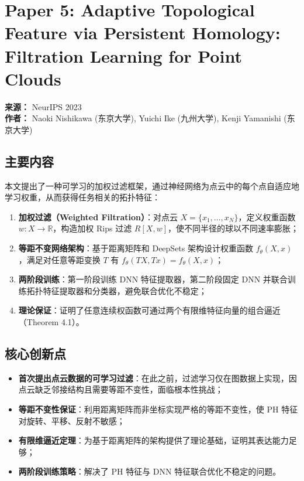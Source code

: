 \documentclass[11pt,a4paper]{article}
\begin{document}
\section{Paper 5: Adaptive Topological Feature via Persistent Homology: Filtration Learning for Point Clouds}

\textbf{来源：} NeurIPS 2023 \\
\textbf{作者：} Naoki Nishikawa (东京大学), Yuichi Ike (九州大学), Kenji Yamanishi (东京大学)

\subsection*{主要内容}
本文提出了一种可学习的加权过滤框架，通过神经网络为点云中的每个点自适应地学习权重，从而获得任务相关的拓扑特征：

\begin{enumerate}[nosep]
  \item \textbf{加权过滤（Weighted Filtration）}：对点云 $X = \{x_1,\ldots,x_N\}$，定义权重函数 $w: X \to \mathbb{R}$，构造加权 Rips 过滤 $R[X, w]$，使不同半径的球以不同速率膨胀；
  \item \textbf{等距不变网络架构}：基于距离矩阵和 DeepSets 架构设计权重函数 $f_\theta(X, x)$，满足对任意等距变换 $T$ 有 $f_\theta(TX, Tx) = f_\theta(X, x)$；
  \item \textbf{两阶段训练}：第一阶段训练 DNN 特征提取器，第二阶段固定 DNN 并联合训练拓扑特征提取器和分类器，避免联合优化不稳定；
  \item \textbf{理论保证}：证明了任意连续权函数可通过两个有限维特征向量的组合逼近（Theorem 4.1）。
\end{enumerate}

\subsection*{核心创新点}
\begin{itemize}[nosep]
  \item \textbf{首次提出点云数据的可学习过滤}：在此之前，过滤学习仅在图数据上实现，因点云缺乏邻接结构且需要等距不变性，面临根本性挑战；
  \item \textbf{等距不变性保证}：利用距离矩阵而非坐标实现严格的等距不变性，使 PH 特征对旋转、平移、反射不敏感；
  \item \textbf{有限维逼近定理}：为基于距离矩阵的架构提供了理论基础，证明其表达能力足够；
  \item \textbf{两阶段训练策略}：解决了 PH 特征与 DNN 特征联合优化不稳定的问题。
\end{itemize}
\end{document}
